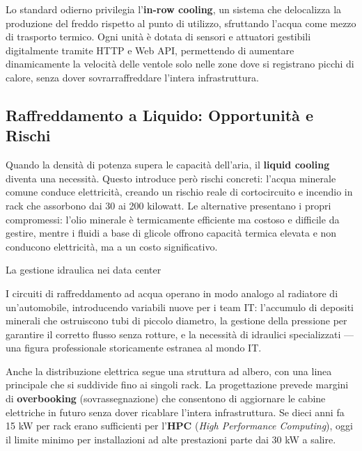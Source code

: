 \documentclass[
  italian,
  openany]{book}
\begin{document}
Lo standard odierno privilegia l'\textbf{in-row cooling}, un sistema che
delocalizza la produzione del freddo rispetto al punto di utilizzo,
sfruttando l'acqua come mezzo di trasporto termico. Ogni unità è dotata
di sensori e attuatori gestibili digitalmente tramite HTTP e Web API,
permettendo di aumentare dinamicamente la velocità delle ventole solo
nelle zone dove si registrano picchi di calore, senza dover
sovrarraffreddare l'intera infrastruttura.

\subsection{Raffreddamento a Liquido: Opportunità e
Rischi}\label{raffreddamento-a-liquido-opportunituxe0-e-rischi}

Quando la densità di potenza supera le capacità dell'aria, il
\textbf{liquid cooling} diventa una necessità. Questo introduce però
rischi concreti: l'acqua minerale comune conduce elettricità, creando un
rischio reale di cortocircuito e incendio in rack che assorbono dai 30
ai 200 kilowatt. Le alternative presentano i propri compromessi: l'olio
minerale è termicamente efficiente ma costoso e difficile da gestire,
mentre i fluidi a base di glicole offrono capacità termica elevata e non
conducono elettricità, ma a un costo significativo.

\begin{calloutwarning}{La gestione idraulica nei data center}

I circuiti di raffreddamento ad acqua operano in modo analogo al
radiatore di un'automobile, introducendo variabili nuove per i team IT:
l'accumulo di depositi minerali che ostruiscono tubi di piccolo
diametro, la gestione della pressione per garantire il corretto flusso
senza rotture, e la necessità di idraulici specializzati --- una figura
professionale storicamente estranea al mondo IT.

\end{calloutwarning}

Anche la distribuzione elettrica segue una struttura ad albero, con una
linea principale che si suddivide fino ai singoli rack. La progettazione
prevede margini di \textbf{overbooking} (sovrassegnazione) che
consentono di aggiornare le cabine elettriche in futuro senza dover
ricablare l'intera infrastruttura. Se dieci anni fa 15 kW per rack erano
sufficienti per l'\textbf{HPC} (\emph{High Performance Computing}), oggi
il limite minimo per installazioni ad alte prestazioni parte dai 30 kW a
salire.
\end{document}

